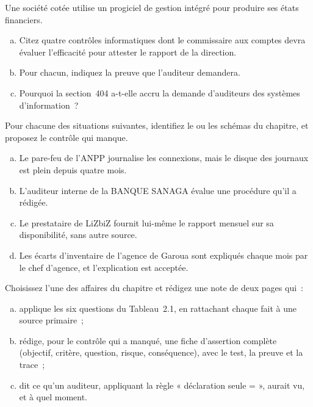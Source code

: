 \begin{boxexo}[title={\ding{45}\quad Exercice~2.7. Section 404 et contrôles informatiques \niveaumoyen}]
Une société cotée utilise un progiciel de gestion intégré pour produire
ses états financiers.
\begin{enumerate}[(a)]
    \item Citez quatre contrôles informatiques dont le commissaire aux
          comptes devra évaluer l'efficacité pour attester le rapport de la
          direction.
    \item Pour chacun, indiquez la preuve que l'auditeur demandera.
    \item Pourquoi la section~404 a-t-elle accru la demande d'auditeurs des
          systèmes d'information~?
\end{enumerate}
\end{boxexo}

\begin{boxexo}[title={\ding{45}\quad Exercice~2.8. Les cinq schémas \niveaumoyen}]
Pour chacune des situations suivantes, identifiez le ou les schémas du
chapitre, et proposez le contrôle qui manque.
\begin{enumerate}[(a)]
    \item Le pare-feu de l'ANPP journalise les connexions, mais le disque
          des journaux est plein depuis quatre mois.
    \item L'auditeur interne de la BANQUE SANAGA évalue une procédure qu'il
          a rédigée.
    \item Le prestataire de LiZbiZ fournit lui-même le rapport mensuel sur
          sa disponibilité, sans autre source.
    \item Les écarts d'inventaire de l'agence de Garoua sont expliqués
          chaque mois par le chef d'agence, et l'explication est acceptée.
\end{enumerate}
\end{boxexo}

\begin{boxexo}[title={\ding{45}\quad Exercice~2.9. Analyser une affaire \niveauexpert}]
Choisissez l'une des affaires du chapitre et rédigez une note de deux pages
qui~:
\begin{enumerate}[(a)]
    \item applique les six questions du Tableau~2.1, en rattachant chaque
          fait à une source primaire~;
    \item rédige, pour le contrôle qui a manqué, une fiche d'assertion
          complète (objectif, critère, question, risque, conséquence), avec
          le test, la preuve et la trace~;
    \item dit ce qu'un auditeur, appliquant la règle « déclaration seule =
          \NEK{} », aurait vu, et à quel moment.
\end{enumerate}
\end{boxexo}

